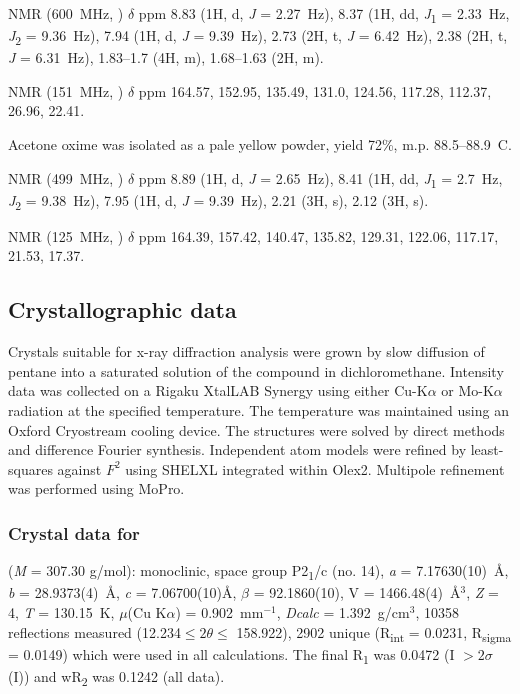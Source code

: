 \begin{refsection}
 NMR (600~MHz, ) $\delta$ ppm 8.83 (1H, d, \textit{J} = 2.27~Hz), 8.37 (1H, dd, \textit{J}\textsubscript{1} = 2.33~Hz, \textit{J}\textsubscript{2} = 9.36~Hz), 7.94 (1H, d, \textit{J} = 9.39~Hz), 2.73 (2H, t, \textit{J} = 6.42~Hz), 2.38 (2H, t, \textit{J} = 6.31~Hz), 1.83--1.7 (4H, m), 1.68--1.63 (2H, m).

 NMR (151~MHz, ) $\delta$ ppm 164.57, 152.95, 135.49, 131.0, 124.56, 117.28, 112.37, 26.96, 22.41.

Acetone oxime  was isolated as a pale yellow powder, yield 72\%, m.p. 88.5--88.9\degree~C.

 NMR (499~MHz, ) $\delta$ ppm 8.89 (1H, d, \textit{J} = 2.65~Hz), 8.41 (1H, dd, \textit{J}\textsubscript{1} = 2.7~Hz, \textit{J}\textsubscript{2} = 9.38~Hz), 7.95 (1H, d, \textit{J} = 9.39~Hz), 2.21 (3H, s), 2.12 (3H, s).

 NMR (125~MHz, ) $\delta$ ppm 164.39, 157.42, 140.47, 135.82, 129.31, 122.06, 117.17, 21.53, 17.37.

\subsection{Crystallographic data}
Crystals suitable for x-ray diffraction analysis were grown by slow diffusion of pentane into a saturated solution of the compound in dichloromethane.
Intensity data was collected on a Rigaku XtalLAB Synergy using either Cu-K$\alpha$ or Mo-K$\alpha$ radiation at the specified temperature. 
The temperature was maintained using an Oxford Cryostream cooling device. 
The structures were solved by direct methods and difference Fourier synthesis.\autocite{Sheldrick2015}
Independent atom models were refined by least-squares against $F^{2}$ using SHELXL integrated within Olex2.\autocite{Sheldrick2008,Dolomanov2009}
Multipole refinement was performed using MoPro.\autocite{Jelsch2005}

\subsubsection{Crystal data for \texorpdfstring{}{C14H17N3O5}}
 (\emph{M} = 307.30 g/mol): monoclinic, space group P2\textsubscript{1}/c (no. 14), \emph{a} = 7.17630(10)~\AA{}, \emph{b} = 28.9373(4)~\AA{}, \emph{c} = 7.06700(10)\AA{}, $\beta$ = 92.1860(10)\degree{}, V = 1466.48(4)~\AA$^3$, \emph{Z} = 4, \emph{T} = 130.15~K, $\mu$(Cu K$\alpha$) = 0.902~mm$^{-1}$, \emph{Dcalc} = 1.392~g/cm$^3$, 10358 reflections measured (12.234\degree{}$\leq 2\theta \leq$ 158.922\degree{}), 2902 unique (R\textsubscript{int} = 0.0231, R\textsubscript{sigma} = 0.0149) which were used in all calculations. The final R\textsubscript{1} was 0.0472 (I $> 2\sigma$(I)) and wR\textsubscript{2} was 0.1242 (all data).


\end{refsection}
